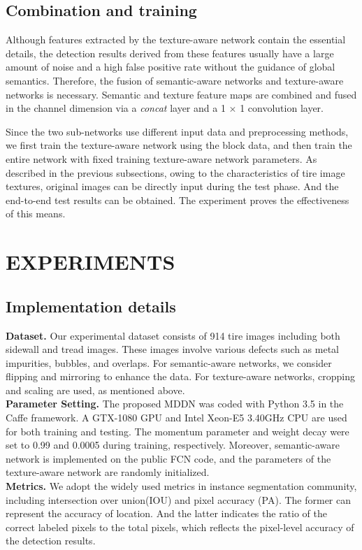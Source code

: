 \documentclass{article}
\begin{document}
\subsection{Combination and training}
\label{Combination and training}

Although features extracted by the texture-aware network contain the essential details, the detection results derived from these features usually have a large amount of noise and a high false positive rate without the guidance of global semantics. Therefore, the fusion of semantic-aware networks and texture-aware networks is necessary. Semantic and texture feature maps are combined and fused in the channel dimension via a {\it concat} layer and a 1 $\times$ 1 convolution layer.

Since the two sub-networks use different input data and preprocessing methods, we first train the texture-aware network using the block data, and then train the entire network with fixed training texture-aware network parameters. As described in the previous subsections, owing to the characteristics of tire image textures, original images can be directly input during the test phase. And the end-to-end test results can be obtained. The experiment proves the effectiveness of this means.

\section{EXPERIMENTS}
\label{sec:pagestyle}
\subsection{Implementation details}
\label{Implementation details}
{\bf Dataset.} Our experimental dataset consists of 914 tire images including both sidewall and tread images. These images involve various defects such as metal impurities, bubbles, and overlaps. For semantic-aware networks, we consider flipping and mirroring to enhance the data. For texture-aware networks, cropping and scaling are used, as mentioned above.\\
{\bf Parameter Setting.} The proposed MDDN was coded with Python 3.5 in the Caffe framework. A GTX-1080 GPU and Intel Xeon-E5 3.40GHz CPU are used for both training and testing. The momentum parameter and weight decay were set to 0.99 and 0.0005 during training, respectively. Moreover, semantic-aware network is implemented on the public FCN code, and the parameters of the texture-aware network are randomly initialized. \\
{\bf Metrics.} We adopt the widely used metrics in instance segmentation community, including intersection over union(IOU) and pixel accuracy (PA). The former can represent the accuracy of location. And the latter indicates the ratio of the correct labeled pixels to the total pixels, which reflects the pixel-level accuracy of the detection results.
\end{document}
